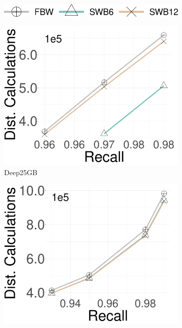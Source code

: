 \begin{figure}[ht]
    \centering
        \begin{subfigure}[b]{0.425\textwidth}
            \captionsetup{justification=centering}
	\centering	
        \includegraphics[width=\textwidth]{../img/oigas/SWB/search/legend.png}
    \end{subfigure}
  
        \begin{subfigure}[b]{0.28\textwidth}
            \captionsetup{justification=centering}
	\centering	
        \includegraphics[width=\textwidth]{../img/oigas/SWB/search/25GB/deep_DC.pdf}
        \caption{Deep25GB}
        \label{fig:SWBsearch:_Time}
    \end{subfigure}
    \hspace{0.4cm}
            \begin{subfigure}[b]{0.28\textwidth}
                \captionsetup{justification=centering}
	\centering	
                \includegraphics[width=\textwidth]{../img/oigas/SWB/search/100GB/deep_DC.pdf}

\end{subfigure}
\end{figure}
